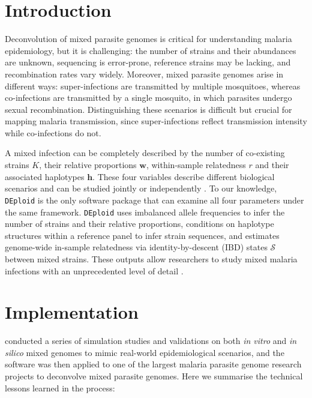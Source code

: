 \documentclass{bioinfo}
\begin{document}
\maketitle

\section{Introduction}

Deconvolution of mixed parasite genomes is critical for understanding malaria epidemiology, but it is challenging: the number of strains and their abundances are unknown, sequencing is error-prone, reference strains may be lacking, and recombination rates vary widely. Moreover, mixed parasite genomes arise in different ways: super-infections are transmitted by multiple mosquitoes, whereas co-infections are transmitted by a single mosquito, in which parasites undergo sexual recombination. Distinguishing these scenarios is difficult but crucial for mapping malaria transmission, since super-infections reflect transmission intensity while co-infections do not.

\noindent A mixed infection can be completely described by the number of co-existing strains $K$, their relative proportions $\mathbf{w}$, within-sample relatedness $r$ and their associated haplotypes $\mathbf{h}$. These four variables describe different biological scenarios and can be studied jointly \citep{Galinsky2015,Jack2016,Henden2016} or independently \citep{Chang2017}. To our knowledge, {\tt DEploid} \citep{Zhu2017,Zhu2019} is the only software package that can examine all four parameters under the same framework. {\tt DEploid} uses imbalanced allele frequencies to infer the number of strains and their relative proportions, conditions on haplotype structures within a reference panel to infer strain sequences, and estimates genome-wide in-sample relatedness via identity-by-descent (IBD) states $\mathcal{S}$ between mixed strains. These outputs allow researchers to study mixed malaria infections with an unprecedented level of detail \citep{auburn2019a}.

\section{Implementation}

\citet{Zhu2017,Zhu2019} conducted a series of simulation studies and validations on both {\it in vitro} and {\it in silico} mixed genomes to mimic real-world epidemiological scenarios, and the software was then applied to one of the largest malaria parasite genome research projects \citep{pf3k} to deconvolve mixed parasite genomes. Here we summarise the technical lessons learned in the process:
\end{document}

